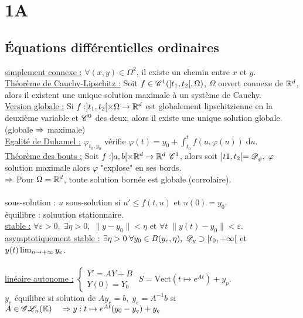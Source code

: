 \documentclass[12 pt]{exampleclass}
\begin{document}
\blankpage

\chapter{1A}

\section{Équations différentielles ordinaires}
\underline{simplement connexe :} $\forall (x,y)\in\Omega^2$, il existe un chemin entre $x$ et $y$.\\
\underline{Théorème de Cauchy-Lipschitz :} Soit $f\in\mathscr{C}^1(]t_1,t_2[,\Omega)$, $\Omega$ ouvert connexe de $\mathbb{R}^d$, alors il existent une unique solution maximale à un système de Cauchy.\\
\underline{Version globale :} Si $f:]t_1,t_2[\times \Omega \to \mathbb{R}^d$ est globalement lipschitzienne en la deuxième variable et $\mathscr{C}^0$ des deux, alors il existe une unique solution globale. \qquad (globale $\Rightarrow$ maximale)\\
\underline{Egalité de Duhamel :} $\varphi_{t_0,y_0}$ vérifie $\varphi(t) = y_0 +\int_{t_0}^t f(u,\varphi(u)) \; \text{d}u$.\\
\underline{Théorème des bouts :} Soit $f:]a,b[\times \mathbb{R}^d \to \mathbb{R}^d \ \mathscr{C}^1$, alors soit $]t1,t_2[ = \mathscr{D}_\varphi, \; \varphi$ solution maximale alors $\varphi$ "explose" en ses bords.\\
$\Rightarrow$ Pour $\Omega=\mathbb{R}^d$, toute solution bornée est globale (corrolaire).\\
\text{}\\
sous-solution : $u$ sous-solution si $u'\leqslant f(t,u)$ et $u(0)=y_0$.\\
équilibre : soluution stationnaire.\\
\underline{stable :} $\forall \varepsilon>0, \; \exists \eta >0, \; \|y-y_0\|<\eta$ et $\forall t \; \|y(t) - y_0\|<\varepsilon$.\\
\underline{asymptotiquement stable :} $\exists \eta >0 \; \forall y_0\in B(y_e,\eta), \; \mathscr{D}_y \supset [t_0,+\infty[$ et $y(t)\lim_{n\to +\infty} y_e$.\\
\text{}\\
\underline{linéaire autonome :} $\begin{cases} Y'=AY+B \\ Y(0) = Y_0 \end{cases}$ \qquad \qquad $S = \text{Vect}(t\mapsto e^{At}) +y_p$.\\
$y_e$ équilibre si solution de $Ay_e =b, \; y_e=A^{-1}b$ si $A\in\mathscr{G}\mathscr{L}_n(\mathbb{K}) \quad \Rightarrow y:t\mapsto e^{At}(y_0-y_e) + y_e$\\
\end{document}
